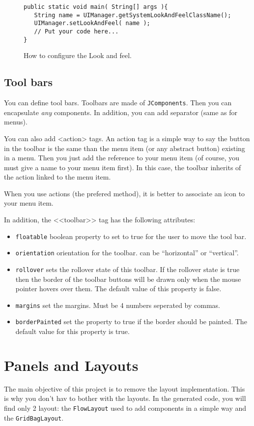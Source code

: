 \documentclass[a4paper,onecolumn,10pt]{book}
\newcommand{\jclass}[1]{\texttt{\small #1}}
\newcommand{\tag}[1]{\textsf{<#1>}}
\begin{document}
\begin{figure}[htb]
\center
\begin{lstlisting}
public static void main( String[] args ){
   String name = UIManager.getSystemLookAndFeelClassName();
   UIManager.setLookAndFeel( name );
   // Put your code here...
}
\end{lstlisting}
\caption{How to configure the Look and feel.}
\label{fig:lookandfeel}
\end{figure}

\subsection{\label{sec:JToolBar}Tool bars}
You can define tool bars. Toolbars are made of \jclass{JComponents}. Then you
can encapsulate \emph{any} components. In addition, you can add separator (same
as for menus).


You can also add \tag{action} tags. An action tag is a simple way to say the
button in the toolbar is the same than the menu item (or any abstract button)
existing in a menu. Then you just add the reference to your menu item (of
course, you must give a name to your menu item first). In this case, the
toolbar inherits of the action linked to the menu item.

 
When you use actions (the prefered method), it is better to associate an icon
to your menu item.


In addition, the \tag{<toolbar>} tag has the following attributes:
\begin{itemize}
  \item \verb|floatable| boolean property to set to true for the user
		to move the tool bar.
  \item \verb|orientation| orientation for the toolbar. can be
		``horizontal'' or ``vertical''.
  \item \verb|rollover| sets the rollover state of this toolbar. If
		the rollover state is true then the border of the toolbar
		buttons will be drawn only when the mouse pointer hovers
		over them. The default value of this property is false.
  \item \verb|margins| set the margins. Must be 4 numbers seperated
		by commas.
  \item \verb|borderPainted| set the property to true if the border
		should be painted. The default value for this property is true.
\end{itemize}

 

\section{Panels and Layouts}
The main objective of this project is to remove the layout implementation.
This is why you don't hav to bother with the layouts. In the generated code,
you will find only 2 layout: the \jclass{FlowLayout} used to add components
in a simple way and the \jclass{GridBagLayout}.
\end{document}
